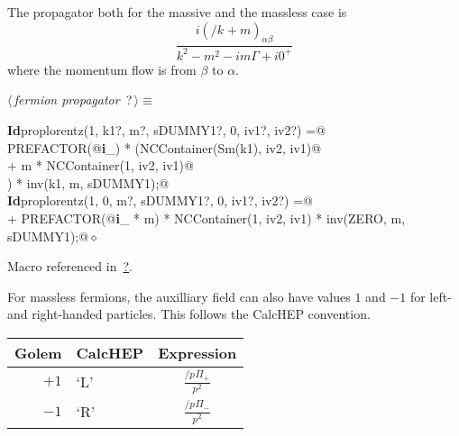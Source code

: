 \documentclass[a4paper,12pt]{amsart}
\newcommand{\fmslash}[1]{\ensuremath{/\!\!\!{#1}}}
\newcommand{\pslash}[1][{}]{\fmslash{p}_{#1}}
\newcommand{\kslash}[1][{}]{\fmslash{k}_{#1}}
\renewcommand{\NWtarget}[2]{\hypertarget{#1}{#2}}
\renewcommand{\NWlink}[2]{\hyperlink{#1}{#2}}
\renewcommand{\NWtxtMacroRefIn}{Macro referenced in}
\renewcommand{\NWsep}{${\diamond}$}
\begin{document}
The propagator both for the massive and the massless case is
\begin{equation}
\frac{i(\kslash + m)_{\alpha\beta}}{k^2-m^2-im\Gamma+i0^+}
\end{equation}
where the momentum flow is from $\beta$ to $\alpha$.
\begin{flushleft} \small
\begin{minipage}{\linewidth}\label{scrap6}\raggedright\small
\NWtarget{nuweb?}{} $\langle\,${\it fermion propagator}\nobreak\ {\footnotesize {?}}$\,\rangle\equiv$
\vspace{-1ex}
\begin{list}{}{} \item
\mbox{}\verb@@\hbox{\sffamily\bfseries Id}\verb@ proplorentz(1, k1?, m?, sDUMMY1?, 0, iv1?, iv2?) =@\\
\mbox{}\verb@  PREFACTOR(@\hbox{\sffamily\bfseries i}\verb@_) * (NCContainer(Sm(k1), iv2, iv1)@\\
\mbox{}\verb@   + m * NCContainer(1, iv2, iv1)@\\
\mbox{}\verb@  ) * inv(k1, m, sDUMMY1);@\\
\mbox{}\verb@@\hbox{\sffamily\bfseries Id}\verb@ proplorentz(1, 0, m?, sDUMMY1?, 0, iv1?, iv2?) =@\\
\mbox{}\verb@   + PREFACTOR(@\hbox{\sffamily\bfseries i}\verb@_ * m) * NCContainer(1, iv2, iv1) * inv(ZERO, m, sDUMMY1);@{\NWsep}
\end{list}
\vspace{-1.5ex}
\footnotesize
\begin{list}{}{\setlength{\itemsep}{-\parsep}\setlength{\itemindent}{-\leftmargin}}
\item \NWtxtMacroRefIn\ \NWlink{nuweb?}{?}.

\item{}
\end{list}
\end{minipage}\vspace{4ex}
\end{flushleft}
For massless fermions,
the auxilliary field can also have values $1$ and $-1$ for
left- and right-handed particles. This follows the CalcHEP convention.
\begin{center}
\begin{tabular}{rlc}
Golem & CalcHEP & Expression\\
\hline
$+1$ & `L' & $\frac{\pslash\Pi_+}{p^2}$ \\
$-1$ & `R' & $\frac{\pslash\Pi_-}{p^2}$
\end{tabular}
\end{center}
\end{document}
